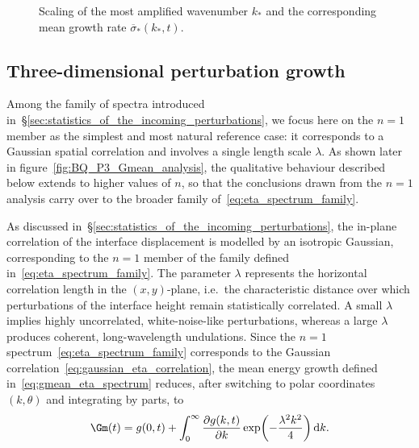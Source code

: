 \begin{figure}
  \centering
  \begin{minipage}{0.48\textwidth}
    \centering
    
  \end{minipage}
  \hfill
  \begin{minipage}{0.48\textwidth}
    \centering
    
  \end{minipage}
  \caption{Scaling of the most amplified wavenumber \(k_\ast\) and the corresponding mean growth
  rate \(\overline{\sigma}_\ast(k_\ast,t)\).}
  \label{fig:BQ_P1_scaling}
\end{figure}

\subsection{Three-dimensional perturbation growth}
Among the family of spectra introduced in~\S\ref{sec:statistics_of_the_incoming_perturbations},
we focus here on the \(n=1\) member as the simplest and most natural reference case: it
corresponds to a Gaussian spatial correlation and involves a single length scale \(\lambda\). As
shown later in figure~\ref{fig:BQ_P3_Gmean_analysis}, the qualitative behaviour described below
extends to higher values of \(n\), so that the conclusions drawn from the \(n=1\) analysis carry
over to the broader family of~\eqref{eq:eta_spectrum_family}.

As discussed in~\S\ref{sec:statistics_of_the_incoming_perturbations}, the in-plane correlation of
the interface displacement is modelled by an isotropic Gaussian, corresponding to the \(n=1\)
member of the family defined in~\eqref{eq:eta_spectrum_family}. The parameter \(\lambda\)
represents the horizontal correlation length in the \((x,y)\)-plane, i.e.\ the characteristic
distance over which perturbations of the interface height remain statistically correlated. A small
\(\lambda\) implies highly uncorrelated, white-noise-like perturbations, whereas a large \(\lambda\)
produces coherent, long-wavelength undulations. Since the \(n=1\) spectrum~\eqref{eq:eta_spectrum_family}
corresponds to the Gaussian correlation~\eqref{eq:gaussian_eta_correlation}, the mean energy
growth defined in~\eqref{eq:gmean_eta_spectrum} reduces, after switching to polar coordinates
\((k,\theta)\) and integrating by parts, to
\begin{equation}
    \label{eq:bq_gmean_isotropic}
    \Gm(t)
    =
    g(0,t)
    +
    \int_{0}^{\infty}
    \frac{\partial g(k,t)}{\partial k}
    \exp\!\left(-\frac{\lambda^{2}k^{2}}{4}\right)\mathrm{d}k.
\end{equation}

